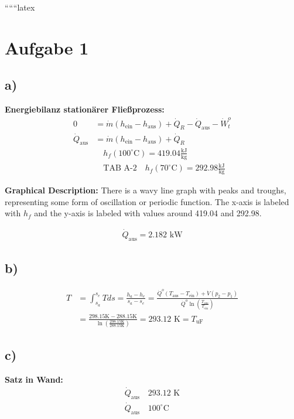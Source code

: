 
``````latex


\section*{Aufgabe 1}

\subsection*{a)}
\textbf{Energiebilanz stationärer Fließprozess:}
\begin{align*}
0 &= \dot{m} (h_{\text{ein}} - h_{\text{aus}}) + \dot{Q}_R - \dot{Q}_{\text{aus}} - \dot{W}_t^o \\
\dot{Q}_{\text{aus}} &= \dot{m} (h_{\text{ein}} - h_{\text{aus}}) + \dot{Q}_R \\
& \quad h_f(100^\circ \text{C}) = 419.04 \frac{\text{kJ}}{\text{kg}} \\
& \quad \text{TAB A-2} \quad h_f(70^\circ \text{C}) = 292.98 \frac{\text{kJ}}{\text{kg}}
\end{align*}

\textbf{Graphical Description:}
There is a wavy line graph with peaks and troughs, representing some form of oscillation or periodic function. The x-axis is labeled with $h_f$ and the y-axis is labeled with values around 419.04 and 292.98.

\begin{align*}
\dot{Q}_{\text{aus}} = 2.182 \text{ kW}
\end{align*}

\subsection*{b)}
\begin{align*}
T &= \int_{s_a}^{s_e} T ds = \frac{h_a - h_e}{s_a - s_e} = \frac{\dot{Q}^o (T_{\text{aus}} - T_{\text{ein}}) + \dot{V} (p_2 - p_1)}{\dot{Q}^o \ln \left( \frac{T_{\text{aus}}}{T_{\text{ein}}} \right)} \\
&= \frac{298.15 \text{K} - 288.15 \text{K}}{\ln \left( \frac{298.15 \text{K}}{288.15 \text{K}} \right)} = 293.12 \text{ K} = T_{\text{uF}}
\end{align*}

\subsection*{c)}
\textbf{Satz in Wand:}
\begin{align*}
\dot{Q}_{\text{aus}} \quad 293.12 \text{ K} \\
\dot{Q}_{\text{aus}} \quad 100^\circ \text{C}
\end{align*}

